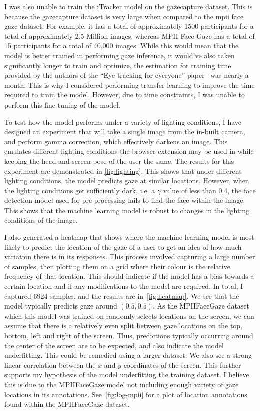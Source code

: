 \documentclass{report}
\begin{document}
I was also unable to train the iTracker model on the gazecapture dataset. This is because the gazecapture dataset is very large when compared to the mpii face gaze dataset. For example, it has a total of approximately 1500 participants for a total of approximately 2.5 Million images, whereas MPII Face Gaze has a total of 15 participants for a total of 40,000 images. While this would mean that the model is better trained in performing gaze inference, it would've also taken significantly longer to train and optimize, the estimation for training time provided by the authors of the ``Eye tracking for everyone'' paper~\cite{krafka2016eye} was nearly a month. This is why I considered performing transfer learning to improve the time required to train the model. However, due to time constraints, I was unable to perform this fine-tuning of the model.

To test how the model performs under a variety of lighting conditions, I have designed an experiment that will take a single image from the in-built camera, and perform gamma correction, which effectively darkens an image. This emulates different lighting conditions the browser extension may be used in while keeping the head and screen pose of the user the same. The results for this experiment are demonstrated in \autoref{fig:lighting}. This shows that under different lighting conditions, the model predicts gaze at similar locations. However, when the lighting conditions get sufficiently dark, i.e. a $\gamma$ value of less than 0.4, the face detection model used for pre-processing fails to find the face within the image. This shows that the machine learning model is robust to changes in the lighting conditions of the image. 

I also generated a heatmap that shows where the machine learning model is most likely to predict the location of the gaze of a user to get an idea of how much variation there is in its responses. This process involved capturing a large number of samples, then plotting them on a grid where their colour is the relative frequency of that location. This should indicate if the model has a bias towards a certain location and if any modifications to the model are required. In total, I captured $6924$ samples, and the results are in~\autoref{fig:heatmap}. We see that the model typically predicts gaze around $(0.5, 0.5)$. As the MPIIFaceGaze dataset which this model was trained on randomly selects locations on the screen, we can assume that there is a relatively even split between gaze locations on the top, bottom, left and right of the screen. Thus, predictions typically occurring around the center of the screen are to be expected, and also indicate the model underfitting. This could be remedied using a larger dataset. We also see a strong linear correlation between the $x$ and $y$ coordinates of the screen. This further supports my hypothesis of the model underfitting the training dataset. I believe this is due to the MPIIFaceGaze model not including enough variety of gaze locations in its annotations. See~\autoref{fig:log-mpii} for a plot of location annotations found within the MPIIFaceGaze dataset.
\end{document}
